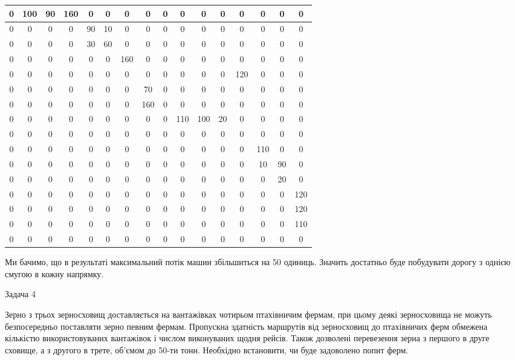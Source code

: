 \documentclass[a4paper,14pt,russian,ukrainian,oneside,final]{extreport}
\begin{document}
\begin{center}
\begin{tabular}{|c|c|c|c|c|c|c|c|c|c|c|c|c|c|c|c|}
\hline
0&100&90&160&0&0&0&0&0&0&0&0&0&0&0&0 \\ \hline
0&0&0&0&90&10&0&0&0&0&0&0&0&0&0&0 \\ \hline
0&0&0&0&30&60&0&0&0&0&0&0&0&0&0&0 \\ \hline
0&0&0&0&0&0&160&0&0&0&0&0&0&0&0&0 \\ \hline
0&0&0&0&0&0&0&0&0&0&0&0&120&0&0&0 \\ \hline
0&0&0&0&0&0&0&70&0&0&0&0&0&0&0&0 \\ \hline
0&0&0&0&0&0&0&160&0&0&0&0&0&0&0&0 \\ \hline
0&0&0&0&0&0&0&0&0&110&100&20&0&0&0&0 \\ \hline
0&0&0&0&0&0&0&0&0&0&0&0&0&0&0&0 \\ \hline
0&0&0&0&0&0&0&0&0&0&0&0&0&110&0&0 \\ \hline
0&0&0&0&0&0&0&0&0&0&0&0&0&10&90&0 \\ \hline
0&0&0&0&0&0&0&0&0&0&0&0&0&0&20&0 \\ \hline
0&0&0&0&0&0&0&0&0&0&0&0&0&0&0&120 \\ \hline
0&0&0&0&0&0&0&0&0&0&0&0&0&0&0&120 \\ \hline
0&0&0&0&0&0&0&0&0&0&0&0&0&0&0&110 \\ \hline
0&0&0&0&0&0&0&0&0&0&0&0&0&0&0&0 \\
\hline
\end{tabular}
\end{center}
Ми бачимо, що в результаті максимальний потік машин збільшиться на 50 одиниць. Значить достатньо буде побудувати дорогу з однією смугою в кожну напрямку.

Задача 4

\indent
Зерно з трьох зерносховищ доставляється на вантажівках чотирьом птахівничим фермам, при цьому деякі зерносховища не можуть безпосередньо поставляти зерно певним фермам. Пропускна здатність маршрутів від зерносховищ до птахівничих ферм обмежена кількістю використовуваних вантажівок і числом виконуваних щодня рейсів. Також дозволені перевезення зерна з першого в друге сховище, а з другого в трете, об'ємом до 50-ти тонн. Необхідно встановити, чи буде задоволено попит ферм.
\end{document}
